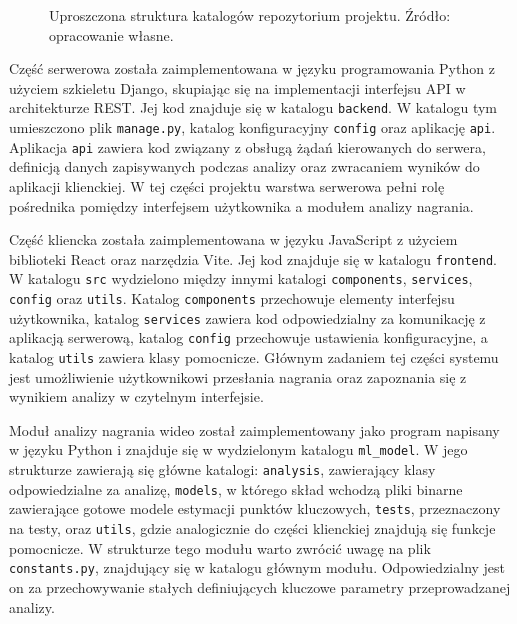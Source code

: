 \begin{figure}[H]
\centering
\begin{minipage}{0.85\textwidth}
\end{minipage}
\caption{Uproszczona struktura katalogów repozytorium projektu. Źródło: opracowanie własne.}
\label{fig:struktura-repozytorium}
\end{figure}


Część serwerowa została zaimplementowana w języku programowania Python z użyciem szkieletu Django, skupiając się na implementacji interfejsu API w architekturze REST. Jej kod znajduje się w katalogu \texttt{backend}. W katalogu tym umieszczono plik \texttt{manage.py}, katalog konfiguracyjny \texttt{config} oraz aplikację \texttt{api}. Aplikacja \texttt{api} zawiera kod związany z obsługą żądań kierowanych do serwera, definicją danych zapisywanych podczas analizy oraz zwracaniem wyników do aplikacji klienckiej. W tej części projektu warstwa serwerowa pełni rolę pośrednika pomiędzy interfejsem użytkownika a modułem analizy nagrania.

Część kliencka została zaimplementowana w języku JavaScript z użyciem biblioteki React oraz narzędzia Vite. Jej kod znajduje się w katalogu \texttt{frontend}. W katalogu \texttt{src} wydzielono między innymi katalogi \texttt{components}, \texttt{services}, \texttt{config} oraz \texttt{utils}. Katalog \texttt{components} przechowuje elementy interfejsu użytkownika, katalog \texttt{services} zawiera kod odpowiedzialny za komunikację z aplikacją serwerową, katalog \texttt{config} przechowuje ustawienia konfiguracyjne, a katalog \texttt{utils} zawiera klasy pomocnicze. Głównym zadaniem tej części systemu jest umożliwienie użytkownikowi przesłania nagrania oraz zapoznania się z wynikiem analizy w czytelnym interfejsie.

Moduł analizy nagrania wideo został zaimplementowany jako program napisany w języku Python i znajduje się w wydzielonym katalogu \texttt{ml\_model}. W jego strukturze zawierają się główne katalogi: \texttt{analysis}, zawierający klasy odpowiedzialne za analizę, \texttt{models}, w którego skład wchodzą pliki binarne zawierające gotowe modele estymacji punktów kluczowych, \texttt{tests}, przeznaczony na testy, oraz \texttt{utils}, gdzie analogicznie do części klienckiej znajdują się funkcje pomocnicze. W strukturze tego modułu warto zwrócić uwagę na plik \texttt{constants.py}, znajdujący się w katalogu głównym modułu. Odpowiedzialny jest on za przechowywanie stałych definiujących kluczowe parametry przeprowadzanej analizy.

